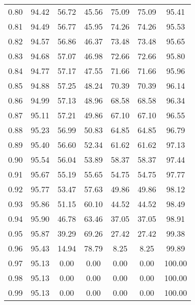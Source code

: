 \begin{tabular}{|c|c|c|c|c|c|c|}
      0.80 &     94.42 &     56.72 &      45.56 &   75.09 &      75.09 &         95.41 \\
      0.81 &     94.49 &     56.77 &      45.95 &   74.26 &      74.26 &         95.53 \\
      0.82 &     94.57 &     56.86 &      46.37 &   73.48 &      73.48 &         95.65 \\
      0.83 &     94.68 &     57.07 &      46.98 &   72.66 &      72.66 &         95.80 \\
      0.84 &     94.77 &     57.17 &      47.55 &   71.66 &      71.66 &         95.96 \\
      0.85 &     94.88 &     57.25 &      48.24 &   70.39 &      70.39 &         96.14 \\
      0.86 &     94.99 &     57.13 &      48.96 &   68.58 &      68.58 &         96.34 \\
      0.87 &     95.11 &     57.21 &      49.86 &   67.10 &      67.10 &         96.55 \\
      0.88 &     95.23 &     56.99 &      50.83 &   64.85 &      64.85 &         96.79 \\
      0.89 &     95.40 &     56.60 &      52.34 &   61.62 &      61.62 &         97.13 \\
      0.90 &     95.54 &     56.04 &      53.89 &   58.37 &      58.37 &         97.44 \\
      0.91 &     95.67 &     55.19 &      55.65 &   54.75 &      54.75 &         97.77 \\
      0.92 &     95.77 &     53.47 &      57.63 &   49.86 &      49.86 &         98.12 \\
      0.93 &     95.86 &     51.15 &      60.10 &   44.52 &      44.52 &         98.49 \\
      0.94 &     95.90 &     46.78 &      63.46 &   37.05 &      37.05 &         98.91 \\
      0.95 &     95.87 &     39.29 &      69.26 &   27.42 &      27.42 &         99.38 \\
      0.96 &     95.43 &     14.94 &      78.79 &    8.25 &       8.25 &         99.89 \\
      0.97 &     95.13 &      0.00 &       0.00 &    0.00 &       0.00 &        100.00 \\
      0.98 &     95.13 &      0.00 &       0.00 &    0.00 &       0.00 &        100.00 \\
      0.99 &     95.13 &      0.00 &       0.00 &    0.00 &       0.00 &        100.00 \\
\bottomrule
\end{tabular}

